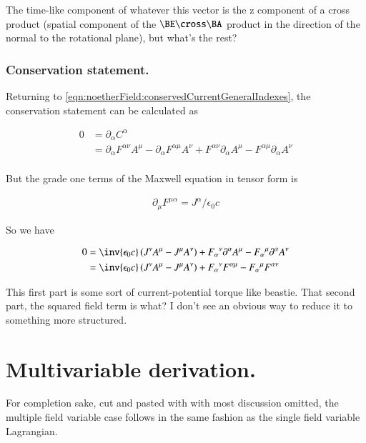 The time-like component of whatever this vector is the z component of a cross product (spatial component of the $\BE \cross \BA$ product in
the direction of the normal to the rotational plane), but what's the rest?

\subsubsection{Conservation statement. }

Returning to \ref{eqn:noetherField:conservedCurrentGeneralIndexes}, the conservation statement can be calculated as

\begin{align*}
0 &= \partial_\alpha C^\alpha \\
&= \partial_\alpha F^{\alpha\nu} A^\mu - \partial_\alpha F^{\alpha\mu} A^\nu + F^{\alpha\nu} \partial_\alpha A^\mu - F^{\alpha\mu} \partial_\alpha A^\nu  \\
\end{align*}

But the grade one terms of the Maxwell equation in tensor form is

\begin{align*}
\partial_\mu F^{\mu \alpha} = J^\alpha/\epsilon_0 c
\end{align*}

So we have 

\begin{align*}
0 
&= \inv{\epsilon_0 c} \left(J^\nu A^\mu - J^\mu A^\nu \right) + {F_{\alpha}}^{\nu} \partial^\alpha A^\mu - {F_{\alpha}}^{\mu} \partial^\alpha A^\nu  \\
&= \inv{\epsilon_0 c} \left(J^\nu A^\mu - J^\mu A^\nu \right) + {F_{\alpha}}^{\nu} F^{\alpha \mu} - {F_{\alpha}}^{\mu} F^{\alpha\nu} \\
\end{align*}

This first part is some sort of current-potential torque like beastie.
That second part, the squared field term is what?  I don't see an obvious way to reduce it to something more structured.

\section{Multivariable derivation.}

For completion sake, cut and pasted with with most discussion omitted, 
the multiple field variable case follows in the same fashion
as the single field variable Lagrangian.

